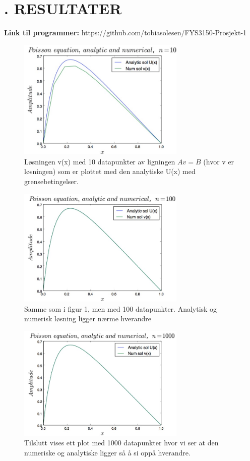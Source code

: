 \documentclass[twocolumn]{article}
\begin{document}
\section*{. RESULTATER}
\textbf{Link til programmer:}
\newline
https://github.com/tobiasolesen/FYS3150-Prosjekt-1
\begin{figure}[H]
\centering
\includegraphics[width=8cm]{1a_n_10.jpg}
\caption{Løsningen v(x) med 10 datapunkter av ligningen $Av = B$ (hvor v er løsningen) som er plottet med den analytiske U(x) med grensebetingelser.}
\end{figure}
\begin{figure}[H]
\centering
\includegraphics[width=8cm]{1a_n_100.jpg}
\caption{Samme som i figur 1, men med 100 datapunkter. Analytisk og numerisk løsning ligger nærme hverandre}
\end{figure}
\begin{figure}[H]
\centering
\includegraphics[width=8cm]{1a_n_1000.jpg}
\caption{Tilslutt vises ett plot med 1000 datapunkter hvor vi ser at den numeriske og analytiske ligger så å si oppå hverandre.}
\end{figure}
\end{document}
